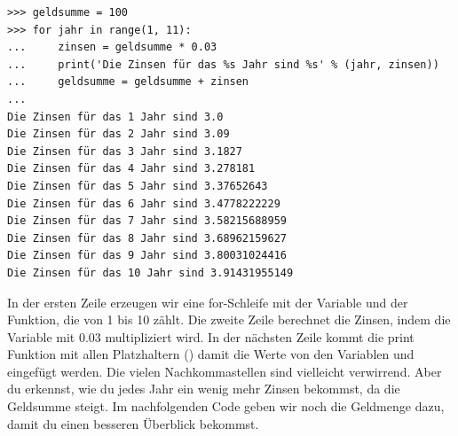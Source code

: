 \begin{Verbatim}[frame=single]
>>> geldsumme = 100
>>> for jahr in range(1, 11):
...     zinsen = geldsumme * 0.03
...     print('Die Zinsen für das %s Jahr sind %s' % (jahr, zinsen))
...     geldsumme = geldsumme + zinsen
...
Die Zinsen für das 1 Jahr sind 3.0
Die Zinsen für das 2 Jahr sind 3.09
Die Zinsen für das 3 Jahr sind 3.1827
Die Zinsen für das 4 Jahr sind 3.278181
Die Zinsen für das 5 Jahr sind 3.37652643
Die Zinsen für das 6 Jahr sind 3.4778222229
Die Zinsen für das 7 Jahr sind 3.58215688959
Die Zinsen für das 8 Jahr sind 3.68962159627
Die Zinsen für das 9 Jahr sind 3.80031024416
Die Zinsen für das 10 Jahr sind 3.91431955149
\end{Verbatim}

In der ersten Zeile erzeugen wir eine for-Schleife mit der  Variable und der  Funktion, die von 1 bis 10 zählt. Die zweite Zeile berechnet die Zinsen, indem die Variable  mit 0.03 multipliziert wird. In der nächsten Zeile kommt die print Funktion mit allen Platzhaltern () damit die Werte von den Variablen  und  eingefügt werden.
Die vielen Nachkommastellen sind vielleicht verwirrend. Aber du erkennst, wie du jedes Jahr ein wenig mehr Zinsen bekommst, da die Geldsumme steigt.
Im nachfolgenden Code geben wir noch die Geldmenge dazu, damit du einen besseren Überblick bekommst.

